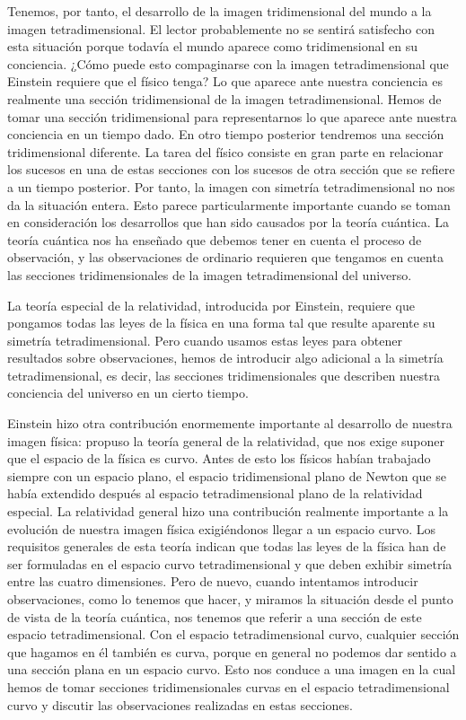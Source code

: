 \documentclass[a4paper, 12pt]{article}
\begin{document}
Tenemos, por tanto, el desarrollo de la imagen tridimensional del mundo a la imagen tetradimensional. El lector probablemente no se sentirá satisfecho con esta situación porque todavía el mundo aparece como tridimensional en su conciencia. ¿Cómo puede esto compaginarse con la imagen tetradimensional que Einstein requiere que el físico tenga? Lo que aparece ante nuestra conciencia es realmente una sección tridimensional de la imagen tetradimensional. Hemos de tomar una sección tridimensional para representarnos lo que aparece ante nuestra conciencia en un tiempo dado. En otro tiempo posterior tendremos una sección tridimensional diferente. La tarea del físico consiste en gran parte en relacionar los sucesos en una de estas secciones con los sucesos de otra sección que se refiere a un tiempo posterior. Por tanto, la imagen con simetría tetradimensional no nos da la situación entera. Esto parece particularmente importante cuando se toman en consideración los desarrollos que han sido causados por la teoría cuántica. La teoría cuántica nos ha enseñado que debemos tener en cuenta el proceso de observación, y las observaciones de ordinario requieren que tengamos en cuenta las secciones tridimensionales de la imagen tetradimensional del universo.

La teoría especial de la relatividad, introducida por Einstein, requiere que pongamos todas las leyes de la física en una forma tal que resulte aparente su simetría tetradimensional. Pero cuando usamos estas leyes para obtener resultados sobre observaciones, hemos de introducir algo adicional a la simetría tetradimensional, es decir, las secciones tridimensionales que describen nuestra conciencia del universo en un cierto tiempo.

Einstein hizo otra contribución enormemente importante al desarrollo de nuestra imagen física: propuso la teoría general de la relatividad, que nos exige suponer que el espacio de la física es curvo. Antes de esto los físicos habían trabajado siempre con un espacio plano, el espacio tridimensional plano de Newton que se había extendido después al espacio tetradimensional plano de la relatividad especial. La relatividad general hizo una contribución realmente importante a la evolución de nuestra imagen física exigiéndonos llegar a un espacio curvo. Los requisitos generales de esta teoría indican que todas las leyes de la física han de ser formuladas en el espacio curvo tetradimensional y que deben exhibir simetría entre las cuatro dimensiones. Pero de nuevo, cuando intentamos introducir observaciones, como lo tenemos que hacer, y miramos la situación desde el punto de vista de la teoría cuántica, nos tenemos que referir a una sección de este espacio tetradimensional. Con el espacio tetradimensional curvo, cualquier sección que hagamos en él también es curva, porque en general no podemos dar sentido a una sección plana en un espacio curvo. Esto nos conduce a una imagen en la cual hemos de tomar secciones tridimensionales curvas en el espacio tetradimensional curvo y discutir las observaciones realizadas en estas secciones. 
\end{document}
